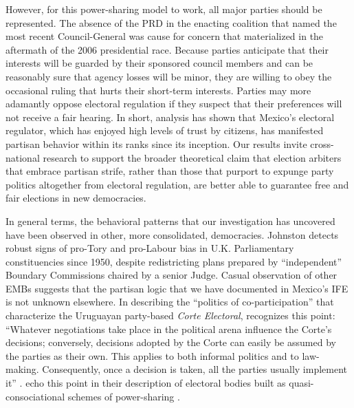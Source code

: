 \documentclass[12 pt, letter]{article}
\begin{document}
However, for this power-sharing model to work, all major parties
should be represented. The absence of the PRD in the enacting
coalition that named the most recent Council-General was cause for
concern that materialized in the aftermath of the 2006 presidential
race. Because parties anticipate that their interests will be
guarded by their sponsored council members and can be reasonably
sure that agency losses will be minor, they are willing to obey the
occasional ruling that hurts their short-term interests. Parties may
more adamantly oppose electoral regulation if they suspect that
their preferences will not receive a fair hearing. In short,
analysis has shown that Mexico's electoral regulator, which has
enjoyed high levels of trust by citizens, has manifested partisan
behavior within its ranks since its inception.   Our results invite
cross-national research to support the broader theoretical claim
that election arbiters that embrace partisan strife, rather than
those that purport to expunge party politics altogether from
electoral regulation, are better able to guarantee free and fair
elections in new democracies.

In general terms, the behavioral patterns that our investigation has
uncovered have been observed in other, more consolidated,
democracies.  Johnston \citeyearpar{Johnston2002} detects robust
signs of pro-Tory and pro-Labour bias in U.K. Parliamentary
constituencies since 1950, despite redistricting plans prepared by
``independent'' Boundary Commissions chaired by a senior Judge.
Casual observation of other EMBs suggests that the partisan logic
that we have documented in Mexico's IFE is not unknown elsewhere. In
describing the ``politics of co-participation'' that characterize
the Uruguayan party-based \emph{Corte Electoral},
\citeauthor{LopezPintor2000} recognizes this point: ``Whatever
negotiations take place in the political arena influence the Corte's
decisions; conversely, decisions adopted by the Corte can easily be
assumed by the parties as their own. This applies to both informal
politics and to law-making. Consequently, once a decision is taken,
all the parties usually implement it'' \citep[p.
23]{LopezPintor2000}. \citeauthor{Mozaffar2002a} echo this point in
their description of electoral bodies built as quasi-consociational
schemes of power-sharing \citep[p. 16]{Mozaffar2002a}.
\end{document}
